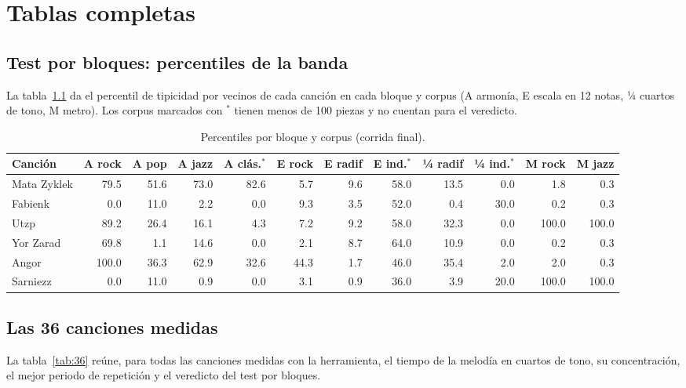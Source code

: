 \chapter{Tablas completas}\label{ap:tablas}

\section{Test por bloques: percentiles de la banda}

La tabla~\ref{tab:bloques-completa} da el percentil de tipicidad por vecinos de cada canción en cada bloque y corpus
(A armonía, E escala en 12 notas, ¼ cuartos de tono, M metro). Los corpus marcados con $^*$ tienen menos de 100 piezas y no
cuentan para el veredicto.

\begin{table}[ht]
  \centering\scriptsize
  \caption{Percentiles por bloque y corpus (corrida final).}\label{tab:bloques-completa}
  \setlength{\tabcolsep}{3.2pt}
  \begin{tabular}{@{}lrrrrrrrrrrr@{}}
    \toprule
    Canción & A rock & A pop & A jazz & A clás.$^*$ & E rock & E radif & E ind.$^*$ & ¼ radif & ¼ ind.$^*$ & M rock & M jazz \\
    \midrule
    Mata Zyklek & 79.5 & 51.6 & 73.0 & 82.6 & 5.7 & 9.6 & 58.0 & 13.5 & 0.0 & 1.8 & 0.3 \\
    Fabienk & 0.0 & 11.0 & 2.2 & 0.0 & 9.3 & 3.5 & 52.0 & 0.4 & 30.0 & 0.2 & 0.3 \\
    Utzp & 89.2 & 26.4 & 16.1 & 4.3 & 7.2 & 9.2 & 58.0 & 32.3 & 0.0 & 100.0 & 100.0 \\
    Yor Zarad & 69.8 & 1.1 & 14.6 & 0.0 & 2.1 & 8.7 & 64.0 & 10.9 & 0.0 & 0.2 & 0.3 \\
    Angor & 100.0 & 36.3 & 62.9 & 32.6 & 44.3 & 1.7 & 46.0 & 35.4 & 2.0 & 2.0 & 0.3 \\
    Sarniezz & 0.0 & 11.0 & 0.9 & 0.0 & 3.1 & 0.9 & 36.0 & 3.9 & 20.0 & 100.0 & 100.0 \\
    \bottomrule
  \end{tabular}
\end{table}

\section{Las 36 canciones medidas}

La tabla~\ref{tab:36} reúne, para todas las canciones medidas con la herramienta, el tiempo de la melodía en cuartos de
tono, su concentración, el mejor periodo de repetición y el veredicto del test por bloques.

